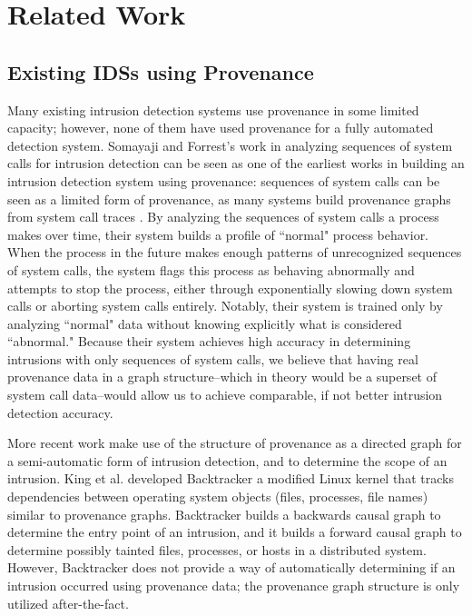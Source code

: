 \documentclass[10pt,twocolumn]{article}
\begin{document}
%

\section{Related Work}

\subsection{Existing IDSs using Provenance}

Many existing intrusion detection systems use provenance in some limited capacity; however, none of them
have used provenance for a fully automated detection system. 
Somayaji and Forrest's work in analyzing sequences of system calls for intrusion detection \cite{somayaji, somayaji-recent} can
be seen as one of the earliest works in building an intrusion detection system using provenance: sequences of
system calls can be seen as a limited form of provenance, as many systems build provenance graphs from
system call traces \cite{spade}. By analyzing the sequences
of system calls a process makes over time, their system builds a profile of ``normal" process behavior. When
the process in the future makes enough patterns of unrecognized sequences of system calls, the system flags
this process as behaving abnormally and attempts to stop the process, either through exponentially slowing down
system calls or aborting system calls entirely. Notably, their system is trained only by analyzing ``normal" data
without knowing explicitly what is considered ``abnormal." Because their system achieves high
accuracy in determining intrusions with only sequences of system calls, we believe that having real provenance
data in a graph structure--which in theory would be a superset of system call data--would allow us
to achieve comparable, if not better intrusion detection accuracy.

More recent work make use of the structure of provenance as a directed graph for a semi-automatic form
of intrusion detection, and to determine the scope of an intrusion. King et al. developed Backtracker \cite{backtracker}
 a modified
Linux kernel that tracks dependencies between operating system objects (files, processes, file names) similar
to provenance graphs. Backtracker builds a backwards causal graph to determine the entry point of an intrusion,
and it builds a forward causal graph to determine possibly tainted files, processes, or hosts in a distributed
system. However, Backtracker does not provide a way of automatically determining if an intrusion occurred
using provenance data; the provenance graph structure is only utilized after-the-fact.
\end{document}
